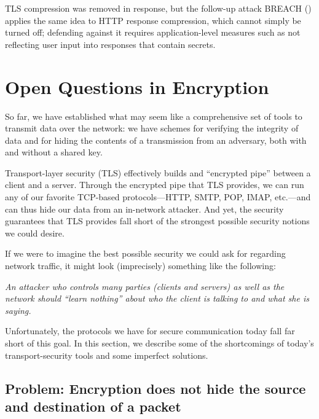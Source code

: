 \documentclass[
  letterpaper,
]{scrbook}
\theoremstyle{definition}
\theoremstyle{plain}
\theoremstyle{plain}
\theoremstyle{remark}
\begin{document}
TLS compression was removed in response, but the follow-up attack BREACH
() applies the same idea to HTTP
response compression, which cannot simply be turned off; defending
against it requires application-level measures such as not reflecting
user input into responses that contain secrets.

\chapter{Open Questions in
Encryption}\label{open-questions-in-encryption}

So far, we have established what may seem like a comprehensive set of
tools to transmit data over the network: we have schemes for verifying
the integrity of data and for hiding the contents of a transmission from
an adversary, both with and without a shared key.

Transport-layer security (TLS) effectively builds and ``encrypted pipe''
between a client and a server. Through the encrypted pipe that TLS
provides, we can run any of our favorite TCP-based protocols---HTTP,
SMTP, POP, IMAP, etc.---and can thus hide our data from an in-network
attacker. And yet, the security guarantees that TLS provides fall short
of the strongest possible security notions we could desire.

If we were to imagine the best possible security we could ask for
regarding network traffic, it might look (imprecisely) something like
the following:

\begin{tcolorbox}[enhanced jigsaw, arc=.35mm, bottomrule=.15mm, breakable, colback=white, colframe=quarto-callout-note-color-frame, left=2mm, leftrule=.75mm, opacityback=0, rightrule=.15mm, toprule=.15mm]

\emph{An attacker who controls many parties (clients and servers) as
well as the network should ``learn nothing'' about who the client is
talking to and what she is saying.}

\end{tcolorbox}

Unfortunately, the protocols we have for secure communication today fall
far short of this goal. In this section, we describe some of the
shortcomings of today's transport-security tools and some imperfect
solutions.

\section{Problem: Encryption does not hide the source and destination of
a
packet}\label{problem-encryption-does-not-hide-the-source-and-destination-of-a-packet}
\end{document}
